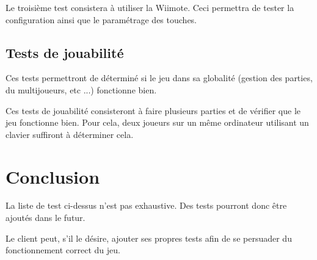 Le troisième test consistera à utiliser la Wiimote. Ceci permettra de tester la configuration ainsi que le paramétrage des touches.

\subsection{Tests de jouabilité}

Ces tests permettront de déterminé si le jeu dans sa globalité (gestion des parties, du multijoueurs, etc ...) fonctionne bien.

Ces tests de jouabilité consisteront à faire plusieurs parties et de vérifier que le jeu fonctionne bien. Pour cela, deux joueurs sur un même ordinateur utilisant un clavier suffiront à déterminer cela.

\newpage

\section*{Conclusion}

La liste de test ci-dessus n'est pas exhaustive. Des tests pourront donc être ajoutés dans le futur.

Le client peut, s'il le désire, ajouter ses propres tests afin de se persuader du fonctionnement correct du jeu.